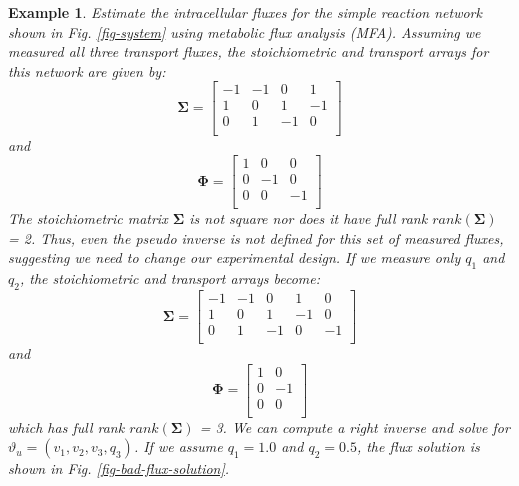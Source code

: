 \documentclass[11pt]{article}
\newtheorem{example}{Example}[section]
\theoremstyle{definition}
\begin{document}
\begin{example}
	Estimate the intracellular fluxes for the simple reaction network shown in Fig. \eqref{fig-system} using metabolic flux analysis (MFA).
	Assuming we measured all three transport fluxes, the stoichiometric and transport arrays for this network are given by:
	\begin{equation}
	\mathbf{\Sigma} =
	\begin{bmatrix}
		-1 & -1 & 0 & 1 \\
		1 & 0 & 1 & -1 \\
		0 & 1 & -1 & 0 \\
	\end{bmatrix}
	\end{equation} and
	\begin{equation}
		\mathbf{\Phi} =
		\begin{bmatrix}
			1 & 0 & 0 \\
			0 & -1 & 0 \\
			0 & 0 & -1 \\
		\end{bmatrix}
	\end{equation}
	The stoichiometric matrix $\mathbf{\Sigma}$ is not square nor does it have full rank $rank\left(\mathbf{\Sigma}\right)$ = 2.
	Thus, even the pseudo inverse is not defined for this set of measured fluxes, suggesting we need to change our experimental design.
	If we measure only $q_{1}$ and $q_{2}$, the stoichiometric and transport arrays become:
	\begin{equation}
	\mathbf{\Sigma} =
	\begin{bmatrix}
		-1 & -1 & 0 & 1 & 0 \\
		1 & 0 & 1 & -1 & 0 \\
		0 & 1 & -1 & 0 & -1 \\
	\end{bmatrix}
	\end{equation} and
	\begin{equation}
		\mathbf{\Phi} =
		\begin{bmatrix}
			1 & 0 \\
			0 & -1 \\
			0 & 0 \\
		\end{bmatrix}
	\end{equation}which has full rank $rank\left(\mathbf{\Sigma}\right)$ = 3.
	We can compute a right inverse and solve for $\vartheta_{u} = \left(v_{1},v_{2},v_{3},q_{3}\right)$.
	If we assume $q_{1} = 1.0$ and $q_{2} = 0.5$, the flux solution is shown in Fig. \eqref{fig-bad-flux-solution}.


\end{example}
\end{document}
